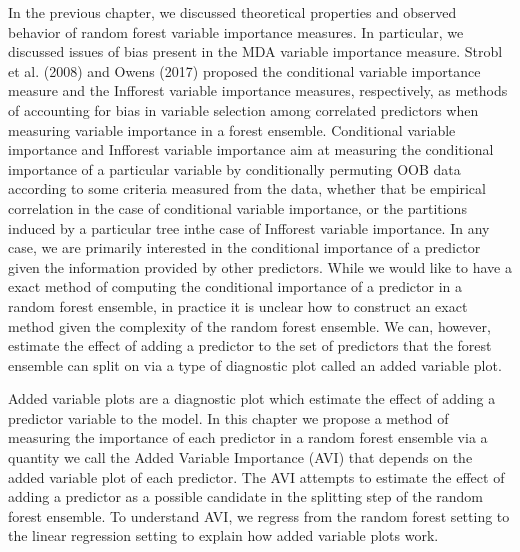 \documentclass[12pt,twoside]{reedthesis}
\theoremstyle{definition}
\theoremstyle{definition}
\theoremstyle{definition}
\theoremstyle{remark}
\begin{document}
In the previous chapter, we discussed theoretical properties and
observed behavior of random forest variable importance measures. In
particular, we discussed issues of bias present in the MDA variable
importance measure. Strobl et al. (2008) and Owens (2017) proposed the
conditional variable importance measure and the Infforest variable
importance measures, respectively, as methods of accounting for bias in
variable selection among correlated predictors when measuring variable
importance in a forest ensemble. Conditional variable importance and
Infforest variable importance aim at measuring the conditional
importance of a particular variable by conditionally permuting OOB data
according to some criteria measured from the data, whether that be
empirical correlation in the case of conditional variable importance, or
the partitions induced by a particular tree inthe case of Infforest
variable importance. In any case, we are primarily interested in the
conditional importance of a predictor given the information provided by
other predictors. While we would like to have a exact method of
computing the conditional importance of a predictor in a random forest
ensemble, in practice it is unclear how to construct an exact method
given the complexity of the random forest ensemble. We can, however,
estimate the effect of adding a predictor to the set of predictors that
the forest ensemble can split on via a type of diagnostic plot called an
added variable plot. \par

Added variable plots are a diagnostic plot which estimate the effect of
adding a predictor variable to the model. In this chapter we propose a
method of measuring the importance of each predictor in a random forest
ensemble via a quantity we call the Added Variable Importance (AVI) that
depends on the added variable plot of each predictor. The AVI attempts
to estimate the effect of adding a predictor as a possible candidate in
the splitting step of the random forest ensemble. To understand AVI, we
regress from the random forest setting to the linear regression setting
to explain how added variable plots work. \par
\end{document}
